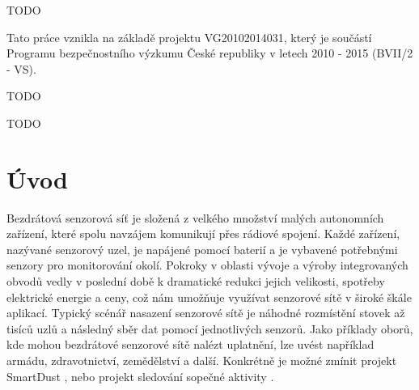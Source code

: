 \documentclass[11pt,final,twoside]{fithesis2}
\begin{document}
\FrontMatter
\ThesisTitlePage

\begin{ThesisDeclaration}
  \DeclarationText
  \AdvisorName
\end{ThesisDeclaration}

\begin{ThesisThanks}
TODO

Tato práce vznikla na základě projektu VG20102014031, který je součástí
Programu bezpečnostního výzkumu České republiky v letech 2010 - 2015
(BVII/2 - VS).
\end{ThesisThanks}

\begin{ThesisAbstract}
TODO
\end{ThesisAbstract}

\begin{ThesisKeyWords}
TODO
\end{ThesisKeyWords}

\MainMatter

\tableofcontents

\chapter{Úvod}
Bezdrátová senzorová síť je složená z velkého množství malých autonomních zařízení, které spolu navzájem komunikují přes rádiové spojení. Každé zařízení, nazývané senzorový uzel, je napájené pomocí
baterií a je vybavené potřebnými senzory pro monitorování okolí. Pokroky v oblasti vývoje a výroby integrovaných obvodů vedly v poslední době k dramatické redukci jejich velikosti, spotřeby elektrické 
energie a ceny, což nám umožňuje využívat senzorové sítě v široké škále aplikací. Typický scénář nasazení senzorové sítě je náhodné rozmístění stovek až tisíců uzlů a následný sběr dat pomocí jednotlivých 
senzorů. Jako příklady oborů, kde mohou bezdrátové senzorové sítě nalézt uplatnění, lze uvést například armádu, zdravotnictví, zemědělství a další. Konkrétně je možné zmínit projekt SmartDust 
\cite{Kahn1999}, nebo projekt sledování sopečné aktivity \cite{Werner-Allen2006}. 
\end{document}
